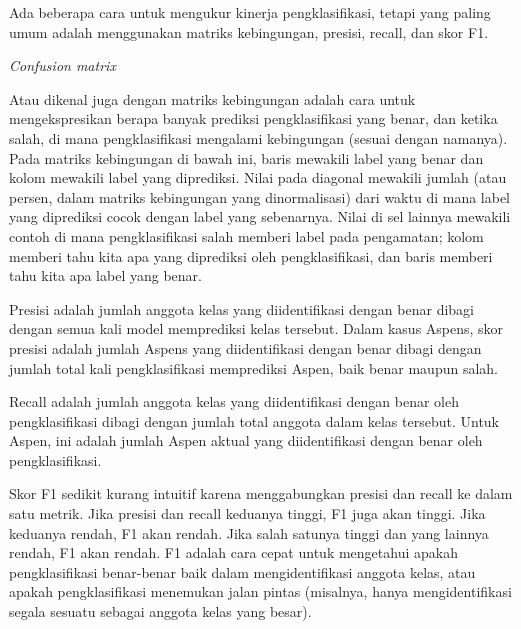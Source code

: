 Ada beberapa cara untuk mengukur kinerja pengklasifikasi, tetapi yang paling umum adalah menggunakan matriks kebingungan, presisi, recall, dan skor F1.

\textit{Confusion matrix}

Atau dikenal juga dengan matriks kebingungan adalah cara untuk mengekspresikan berapa banyak prediksi pengklasifikasi yang benar, dan ketika salah, di mana pengklasifikasi mengalami kebingungan (sesuai dengan namanya). Pada matriks kebingungan di bawah ini, baris mewakili label yang benar dan kolom mewakili label yang diprediksi. Nilai pada diagonal mewakili jumlah (atau persen, dalam matriks kebingungan yang dinormalisasi) dari waktu di mana label yang diprediksi cocok dengan label yang sebenarnya. Nilai di sel lainnya mewakili contoh di mana pengklasifikasi salah memberi label pada pengamatan; kolom memberi tahu kita apa yang diprediksi oleh pengklasifikasi, dan baris memberi tahu kita apa label yang benar.

Presisi adalah jumlah anggota kelas yang diidentifikasi dengan benar dibagi dengan semua kali model memprediksi kelas tersebut. Dalam kasus Aspens, skor presisi adalah jumlah Aspens yang diidentifikasi dengan benar dibagi dengan jumlah total kali pengklasifikasi memprediksi Aspen, baik benar maupun salah.

Recall adalah jumlah anggota kelas yang diidentifikasi dengan benar oleh pengklasifikasi dibagi dengan jumlah total anggota dalam kelas tersebut. Untuk Aspen, ini adalah jumlah Aspen aktual yang diidentifikasi dengan benar oleh pengklasifikasi.

Skor F1 sedikit kurang intuitif karena menggabungkan presisi dan recall ke dalam satu metrik. Jika presisi dan recall keduanya tinggi, F1 juga akan tinggi. Jika keduanya rendah, F1 akan rendah. Jika salah satunya tinggi dan yang lainnya rendah, F1 akan rendah. F1 adalah cara cepat untuk mengetahui apakah pengklasifikasi benar-benar baik dalam mengidentifikasi anggota kelas, atau apakah pengklasifikasi menemukan jalan pintas (misalnya, hanya mengidentifikasi segala sesuatu sebagai anggota kelas yang besar).